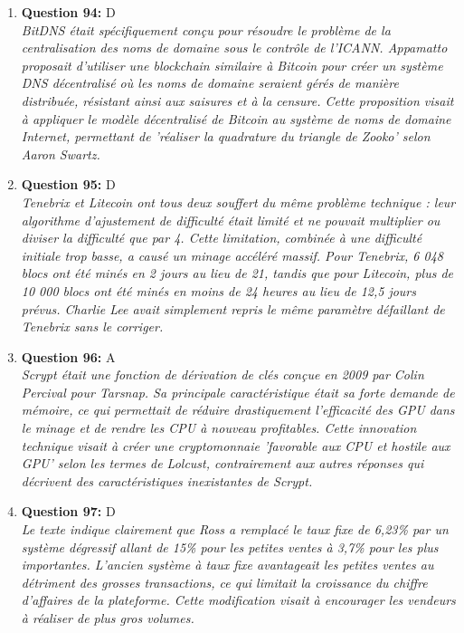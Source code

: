\documentclass[12pt,a4paper]{article}
\begin{document}
\begin{enumerate}
\item \textbf{Question 94:} D
\\ \textit{BitDNS était spécifiquement conçu pour résoudre le problème de la centralisation des noms de domaine sous le contrôle de l'ICANN. Appamatto proposait d'utiliser une blockchain similaire à Bitcoin pour créer un système DNS décentralisé où les noms de domaine seraient gérés de manière distribuée, résistant ainsi aux saisures et à la censure. Cette proposition visait à appliquer le modèle décentralisé de Bitcoin au système de noms de domaine Internet, permettant de 'réaliser la quadrature du triangle de Zooko' selon Aaron Swartz.}

\item \textbf{Question 95:} D
\\ \textit{Tenebrix et Litecoin ont tous deux souffert du même problème technique : leur algorithme d'ajustement de difficulté était limité et ne pouvait multiplier ou diviser la difficulté que par 4. Cette limitation, combinée à une difficulté initiale trop basse, a causé un minage accéléré massif. Pour Tenebrix, 6 048 blocs ont été minés en 2 jours au lieu de 21, tandis que pour Litecoin, plus de 10 000 blocs ont été minés en moins de 24 heures au lieu de 12,5 jours prévus. Charlie Lee avait simplement repris le même paramètre défaillant de Tenebrix sans le corriger.}

\item \textbf{Question 96:} A
\\ \textit{Scrypt était une fonction de dérivation de clés conçue en 2009 par Colin Percival pour Tarsnap. Sa principale caractéristique était sa forte demande de mémoire, ce qui permettait de réduire drastiquement l'efficacité des GPU dans le minage et de rendre les CPU à nouveau profitables. Cette innovation technique visait à créer une cryptomonnaie 'favorable aux CPU et hostile aux GPU' selon les termes de Lolcust, contrairement aux autres réponses qui décrivent des caractéristiques inexistantes de Scrypt.}

\item \textbf{Question 97:} D
\\ \textit{Le texte indique clairement que Ross a remplacé le taux fixe de 6,23\% par un système dégressif allant de 15\% pour les petites ventes à 3,7\% pour les plus importantes. L'ancien système à taux fixe avantageait les petites ventes au détriment des grosses transactions, ce qui limitait la croissance du chiffre d'affaires de la plateforme. Cette modification visait à encourager les vendeurs à réaliser de plus gros volumes.}


\end{enumerate}
\end{document}
